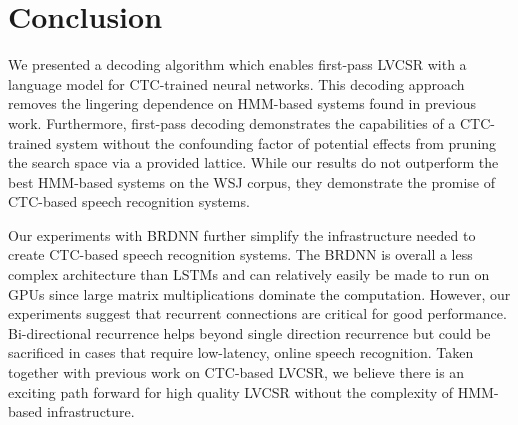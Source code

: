 \section{Conclusion}

We presented a decoding algorithm which enables first-pass LVCSR with a
language model for CTC-trained neural networks. This decoding approach removes
the lingering dependence on HMM-based systems found in previous work.
Furthermore, first-pass decoding demonstrates the capabilities of a CTC-trained
system without the confounding factor of potential effects from pruning the
search space via a provided lattice.  While our results do not outperform the
best HMM-based systems on the WSJ corpus, they demonstrate the promise of
CTC-based speech recognition systems.

Our experiments with BRDNN further simplify the infrastructure needed to create
CTC-based speech recognition systems. The BRDNN is overall a less complex
architecture than LSTMs and can relatively easily be made to run on GPUs since
large matrix multiplications dominate the computation. However, our experiments
suggest that recurrent connections are critical for good performance.
Bi-directional recurrence helps beyond single direction recurrence but could be
sacrificed in cases that require low-latency, online speech recognition. Taken
together with previous work on CTC-based LVCSR, we believe there is an exciting
path forward for high quality LVCSR without the complexity of HMM-based
infrastructure.
